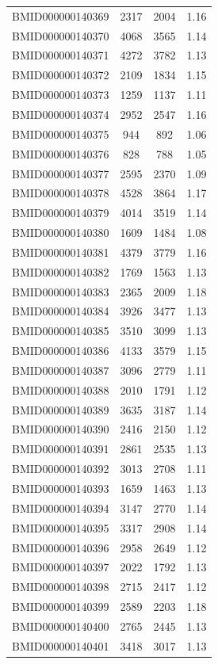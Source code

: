 \documentclass{bmcart}
\begin{document}
\begin{backmatter}
\begin{center}
\begin{longtable}{c|c|c|c}
BMID000000140369 & 2317 & 2004 & 1.16 \\
BMID000000140370 & 4068 & 3565 & 1.14 \\
BMID000000140371 & 4272 & 3782 & 1.13 \\
BMID000000140372 & 2109 & 1834 & 1.15 \\
BMID000000140373 & 1259 & 1137 & 1.11 \\
BMID000000140374 & 2952 & 2547 & 1.16 \\
BMID000000140375 & 944 & 892 & 1.06 \\
BMID000000140376 & 828 & 788 & 1.05 \\
BMID000000140377 & 2595 & 2370 & 1.09 \\
BMID000000140378 & 4528 & 3864 & 1.17 \\
BMID000000140379 & 4014 & 3519 & 1.14 \\
BMID000000140380 & 1609 & 1484 & 1.08 \\
BMID000000140381 & 4379 & 3779 & 1.16 \\
BMID000000140382 & 1769 & 1563 & 1.13 \\
BMID000000140383 & 2365 & 2009 & 1.18 \\
BMID000000140384 & 3926 & 3477 & 1.13 \\
BMID000000140385 & 3510 & 3099 & 1.13 \\
BMID000000140386 & 4133 & 3579 & 1.15 \\
BMID000000140387 & 3096 & 2779 & 1.11 \\
BMID000000140388 & 2010 & 1791 & 1.12 \\
BMID000000140389 & 3635 & 3187 & 1.14 \\
BMID000000140390 & 2416 & 2150 & 1.12 \\
BMID000000140391 & 2861 & 2535 & 1.13 \\
BMID000000140392 & 3013 & 2708 & 1.11 \\
BMID000000140393 & 1659 & 1463 & 1.13 \\
BMID000000140394 & 3147 & 2770 & 1.14 \\
BMID000000140395 & 3317 & 2908 & 1.14 \\
BMID000000140396 & 2958 & 2649 & 1.12 \\
BMID000000140397 & 2022 & 1792 & 1.13 \\
BMID000000140398 & 2715 & 2417 & 1.12 \\
BMID000000140399 & 2589 & 2203 & 1.18 \\
BMID000000140400 & 2765 & 2445 & 1.13 \\
BMID000000140401 & 3418 & 3017 & 1.13 \\

\end{longtable}
\end{center}
\end{backmatter}
\end{document}

